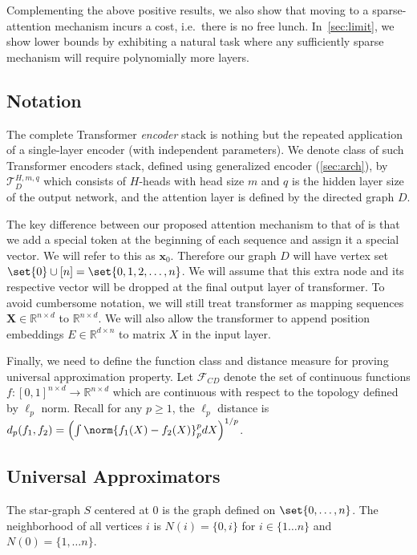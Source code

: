 Complementing the above positive results, we also show that moving to a sparse-attention mechanism incurs a cost, i.e.~there is no free lunch. In~\ref{sec:limit}, we show lower bounds by exhibiting a natural task where any  sufficiently sparse  mechanism will require polynomially more layers. 

\subsection{Notation}
The complete Transformer {\em encoder} stack is nothing but the repeated application of a single-layer encoder (with independent parameters). We denote class of such Transformer encoders stack, defined using  generalized encoder (\ref{sec:arch}),  by $\mathcal{T}_{D}^{H,m,q}$ which consists of $H$-heads with head size $m$ and $q$ is the hidden layer size of the output network, and the attention layer is defined by the directed graph $D$. 

The key difference between our proposed attention mechanism to that of \citet{vaswani2017attention,Yun19} is that we add a special token at the beginning of each sequence and assign it a special vector. We will refer to this as ${\bm{x}}_0$. 
Therefore our graph $D$ will have vertex set $\set{0} \cup [n] = \set{0,1,2,\dots,n}$.
We will assume that this extra node and its respective vector will be dropped at the final output layer of transformer. To avoid cumbersome notation, we will still treat transformer as mapping sequences 
${\bm{X}} \in \mathbb{R}^{n \times d}$ to $\mathbb{R}^{n \times d}$. We will also allow the transformer to append position embeddings  $E \in \mathbb{R}^{d\times n}$ to matrix $X$ in the input layer. 

Finally, we need to define the function class and distance measure for proving universal approximation property. Let $\mathcal{F}_{CD}$ denote the set of continuous functions $f: [0,1]^{n \times d} \to \mathbb{R}^{n \times d} $ which are continuous with respect to the topology defined by  $\ell_p$ norm. Recall for any  $p \geq 1$, the $\ell_p$ distance is $d_p(f_1,f_2)  = \left(\int \norm{f_1(X) - f_2(X)}_p^p dX \right)^{1/p}$.

\subsection{Universal Approximators}

\begin{definition}
The star-graph $S$ centered at $0$ is the graph defined on $\set{0,\dots, n}$. The neighborhood of all vertices $i$ is $N(i) = \{0,i\} $  for $i \in \{1\dots n\}$ and $N(0) = \{1,\dots n\}$. 
\end{definition}


